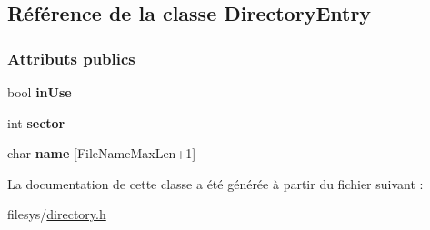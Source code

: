 \hypertarget{class_directory_entry}{}\subsection{Référence de la classe Directory\+Entry}
\label{class_directory_entry}
\subsubsection*{Attributs publics}
\begin{DoxyCompactItemize}
\item 
\hypertarget{class_directory_entry_a0686edcff271cdb66a2cb19696e7200a}{}\label{class_directory_entry_a0686edcff271cdb66a2cb19696e7200a} 
bool {\bfseries in\+Use}
\item 
\hypertarget{class_directory_entry_afe912144a818d7884e3f22c842cac3c5}{}\label{class_directory_entry_afe912144a818d7884e3f22c842cac3c5} 
int {\bfseries sector}
\item 
\hypertarget{class_directory_entry_aee1f8d0797adfa14488f4e4516118664}{}\label{class_directory_entry_aee1f8d0797adfa14488f4e4516118664} 
char {\bfseries name} \mbox{[}File\+Name\+Max\+Len+1\mbox{]}
\end{DoxyCompactItemize}


La documentation de cette classe a été générée à partir du fichier suivant \+:\begin{DoxyCompactItemize}
\item 
filesys/\hyperlink{directory_8h}{directory.\+h}\end{DoxyCompactItemize}
